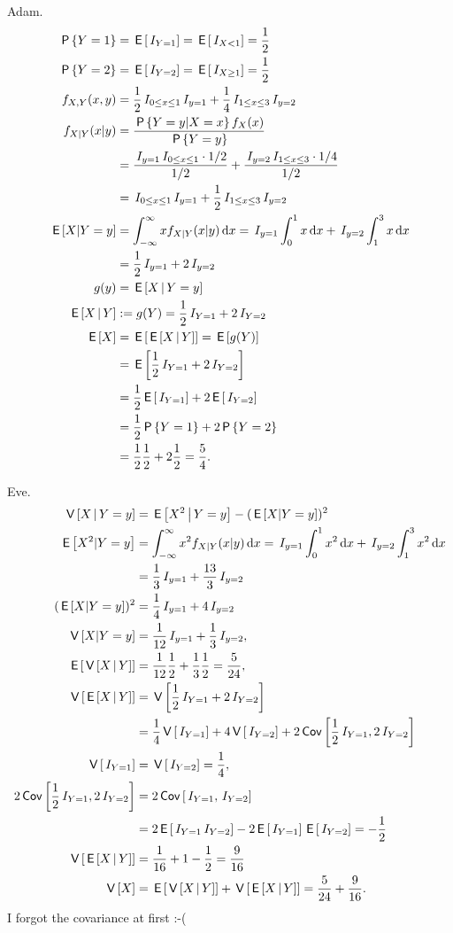\begin{exercise}
\begin{solution}
Adam.
\begin{align}
\P{Y=1} &= \E{\1{Y=1}} = \E{\1{X<1}} = \frac{1}{2} \\
\P{Y=2} &= \E{\1{Y=2}} = \E{\1{X\geq 1}} = \frac{1}{2} \\
f_{X,Y}(x,y) &= \frac{1}{2}\1{0\leq x\leq 1}\1{y=1}+ \frac{1}{4}\1{1\leq x \leq 3}  \1{y=2} \\
  f_{X|Y}(x|y) &= \frac{\P{Y=y|X=x}f_X(x)}{\P{Y=y}}\\
 &=\frac{\1{y=1}\1{0\leq x\leq 1}\cdot 1/2}{1/2} + \frac{\1{y=2}\1{1\leq x\leq 3} \cdot 1/4}{1/2} \\
  &= \1{0\leq x \leq 1} \1{y=1} + \frac{1}{2}\1{1\leq x \leq3}\1{y=2} \\
  \E{X|Y=y} &= \int_{-\infty}^{\infty} x f_{X|Y}(x|y) \d x = \1{y=1}\int_0^1 x \d x + \1{y=2} \int_1^3 x\d x \\
  &= \frac{1}{2} \1{y=1} +  2 \1{y=2}\\
g(y) &= \E{X\given Y=y} \\
\E{X\given Y} &:= g(Y) = \frac{1}{2} \1{Y=1} +  2 \1{Y=2}\\
\E{X} &= \E{\E{X\given Y}} = \E{g(Y)} \\
&=\E{\frac{1}{2} \1{Y=1} + 2 \1{Y=2}} \\
&= \frac{1}{2} \E{\1{Y=1}} + 2 \E{\1{Y=2}} \\
&= \frac{1}{2} \P{Y=1} + 2 \P{Y=2} \\
&= \frac{1}{2} \frac{1}{2} + 2 \frac{1}{2} = \frac{5}{4}.
\end{align}

Eve.
\begin{align}
\V{X\given Y=y} &= \E{X^{2}\given Y=y} - (\E{X|Y=y})^{2}\\
  \E{X^{2}|Y=y} &= \int_{-\infty}^{\infty} x^{2} f_{X|Y}(x|y) \d x = \1{y=1}\int_0^1 x^{2} \d x + \1{y=2} \int_1^3 x^{2}\d x \\
  &= \frac{1}{3}\1{y=1} + \frac{13}{3}\1{y=2} \\
(\E{X|Y=y})^2 &= \frac{1}{4}\1{y=1} + 4 \1{y=2}\\
\V{X|Y=y}&= \frac{1}{12} \1{y=1} + \frac{1}{3} \1{y=2}, \\
\E{\V{X\given Y}} &= \frac{1}{12} \frac{1}{2} + \frac{1}{3} \frac{1}{2} = \frac{5}{24}, \\
\V{\E{X \given Y}} &= \V{\frac{1}{2} \1{Y=1} +  2 \1{Y=2}} \\
&= \frac{1}{4}\V{\1{Y=1}} + 4\V{\1{Y=2}} + 2\cov{\frac{1}{2}\1{Y=1}, 2\1{Y=2}} \\
\V{\1{Y=1}} &= \V{\1{Y=2}}  = \frac{1}{4}, \\
2\cov{\frac{1}{2}\1{Y=1}, 2\1{Y=2}} &= 2\cov{\1{Y=1}, \1{Y=2}} \\
 &= 2\E{\1{Y=1}\1{Y=2}}-2\E{\1{Y=1}}\E{\1{Y=2}} = -\frac{1}{2}\\
\V{\E{X \given Y}} &= \frac{1}{16} + 1 - \frac{1}{2} = \frac{9}{16}\\
\V X &= \E{\V{X\given Y}} + \V{\E{X\given Y}} = \frac{5}{24} + \frac{9}{16}.
\end{align}
I forgot the covariance at first :-(
\end{solution}
\end{exercise}


